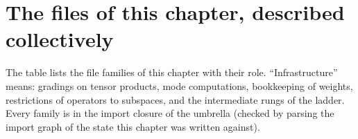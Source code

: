 
\section{The files of this chapter, described collectively}\label{l28:sec:infra}

The table lists the file families of this chapter with their role. ``Infrastructure'' means: gradings on tensor products, mode
computations, bookkeeping of weights, restrictions of operators to subspaces, and the intermediate rungs of the ladder. Every family is in the
import closure of the umbrella  (checked by parsing the import graph of the state this chapter was written against).
